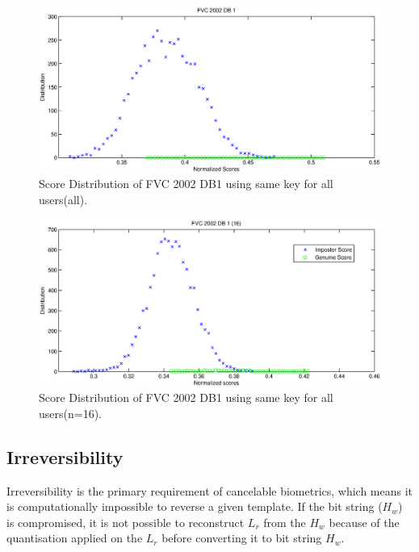 \documentclass[14pt, oneside]{article}   	%
\begin{document}
\begin{figure}[htbp]
\begin{center}
\includegraphics[width=180mm,scale=0.5]{Scoredisf.eps}
\caption{Score Distribution of FVC 2002 DB1 using same key for all users(all).}
\end{center}
\end{figure} 

\begin{figure}[htbp]
\begin{center}
\includegraphics[width=180mm,scale=0.5]{Scoredisf2.eps}
\caption{Score Distribution of FVC 2002 DB1 using same key for all users(n=16).}
\end{center}
\end{figure} 



\subsection{Irreversibility}
Irreversibility is the primary requirement of cancelable biometrics, which means it is computationally impossible to reverse a given template. If the bit string ($H_w$) is compromised, it is not possible to reconstruct $L_r$ from the $H_w$ because of the quantisation applied on the $L_r$ before converting it to bit string $H_w$. 
\end{document}
